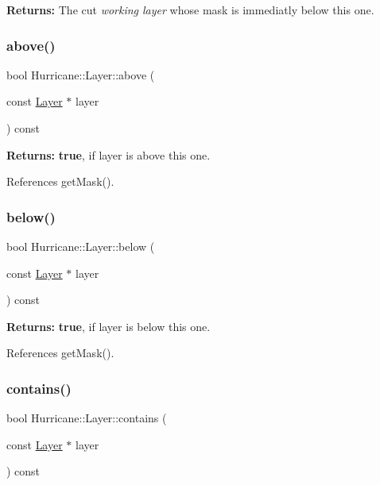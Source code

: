{\bfseries Returns\+:} The cut {\itshape working layer} whose mask is immediatly below this one. \mbox{\label{classHurricane_1_1Layer_abbd13bf66cf75dd6445d0353987119f3}} 
\subsubsection{\texorpdfstring{above()}{above()}}
{\footnotesize\ttfamily bool Hurricane\+::\+Layer\+::above (\begin{DoxyParamCaption}\item[{const \hyperlink{classHurricane_1_1Layer}{Layer} $\ast$}]{layer }\end{DoxyParamCaption}) const\hspace{0.3cm}{\ttfamily [inline]}}

{\bfseries Returns\+:} {\bfseries true}, if {\ttfamily layer} is above this one. 

References get\+Mask().

\mbox{\label{classHurricane_1_1Layer_a090f8697946f721351a626052af25027}} 
\subsubsection{\texorpdfstring{below()}{below()}}
{\footnotesize\ttfamily bool Hurricane\+::\+Layer\+::below (\begin{DoxyParamCaption}\item[{const \hyperlink{classHurricane_1_1Layer}{Layer} $\ast$}]{layer }\end{DoxyParamCaption}) const\hspace{0.3cm}{\ttfamily [inline]}}

{\bfseries Returns\+:} {\bfseries true}, if {\ttfamily layer} is below this one. 

References get\+Mask().

\mbox{\label{classHurricane_1_1Layer_af63dd0a48e2a3514a1cdaccd4586bad8}} 
\subsubsection{\texorpdfstring{contains()}{contains()}}
{\footnotesize\ttfamily bool Hurricane\+::\+Layer\+::contains (\begin{DoxyParamCaption}\item[{const \hyperlink{classHurricane_1_1Layer}{Layer} $\ast$}]{layer }\end{DoxyParamCaption}) const}

